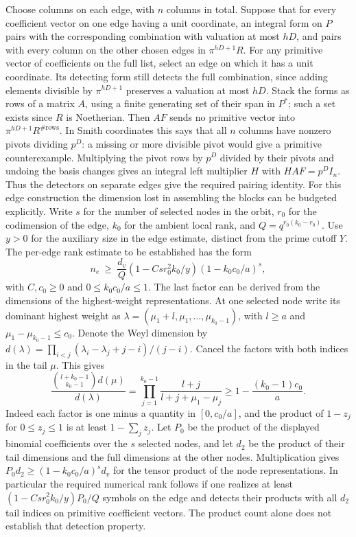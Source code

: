 \documentclass[11pt]{amsart}
\theoremstyle{definition}
\theoremstyle{remark}
\begin{document}
Choose columns on each edge, with $n$ columns in total. Suppose
that for every coefficient vector on one edge having a unit
coordinate, an integral form on $P$ pairs with the corresponding
combination with valuation at most $hD$, and pairs with every
column on the other chosen edges in $\pi^{hD+1}R$.
For any primitive vector of coefficients on the full list, select
an edge on which it has a unit coordinate. Its detecting form still
detects the full combination, since adding elements divisible by
$\pi^{hD+1}$ preserves a valuation at most $hD$. Stack the forms
as rows of a matrix $A$, using a finite generating set of their
span in $P^*$; such a set exists since $R$ is Noetherian.
Then $AF$ sends no primitive vector into $\pi^{hD+1}R^{\#\mathrm{rows}}$.
In Smith coordinates this says that all $n$ columns have nonzero
pivots dividing $p^D$: a missing or more divisible pivot would
give a primitive counterexample. Multiplying the pivot rows by
$p^D$ divided by their pivots and undoing the basis changes gives
an integral left multiplier $H$ with $HAF=p^D I_n$. Thus the
detectors on separate edges give the required pairing identity.
For this edge construction the dimension lost in assembling the
blocks can be budgeted explicitly. Write $s$ for the number of
selected nodes in the orbit, $r_0$ for the codimension of the
edge, $k_0$ for the ambient local rank, and
$Q=q^{r_0(k_0-r_0)}$. Use $y>0$ for the auxiliary size in the
edge estimate, distinct from the prime cutoff $Y$. The per-edge
rank estimate to be established has the form
\[
 n_e\ \ge\ \frac{d_v}{Q}
 (1-C s r_0^2 k_0/y)(1-k_0c_0/a)^s ,
\]
with $C,c_0\ge0$ and $0\le k_0c_0/a\le1$. The last factor can be
derived from the dimensions of the highest-weight representations. At one selected
node write its dominant highest weight as
$\lambda=(\mu_1+l,\mu_1,\ldots,\mu_{k_0-1})$, with $l\ge a$
and $\mu_1-\mu_{k_0-1}\le c_0$. Denote the Weyl dimension by
$d(\lambda)=\prod_{i<j}(\lambda_i-\lambda_j+j-i)/(j-i)$.
Cancel the factors with both indices in the tail $\mu$. This gives
\[
 \frac{\binom{l+k_0-1}{k_0-1}d(\mu)}{d(\lambda)}
 =\prod_{j=1}^{k_0-1}
       \frac{l+j}{l+j+\mu_1-\mu_j}
 \ge 1-\frac{(k_0-1)c_0}{a}.
\]
Indeed each factor is one minus a quantity in $[0,c_0/a]$,
and the product of $1-z_j$ for $0\le z_j\le1$ is at least
$1-\sum_j z_j$. Let $P_0$ be the product of the displayed binomial
coefficients over the $s$ selected nodes, and let $d_2$ be the
product of their tail dimensions and the full dimensions at the
other nodes. Multiplication gives
$P_0d_2\ge(1-k_0c_0/a)^s d_v$ for the tensor product of the
node representations. In particular the required numerical rank
follows if one realizes at least $(1-Csr_0^2 k_0/y)P_0/Q$ symbols
on the edge and detects their products with all $d_2$ tail indices
on primitive coefficient vectors. The product count alone does
not establish that detection property.
\end{document}
